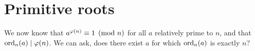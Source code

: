 \section{Primitive roots}\label{primitive-roots}
We now know that $a^{\varphi(n)}\equiv 1\pmod{n}$ for all $a$ relatively prime to $n$, and that $\operatorname{ord}_n(a)\mid \varphi(n)$. We can ask, does there exist $a$ for which $\operatorname{ord}_n(a)$ is exactly $n$?

